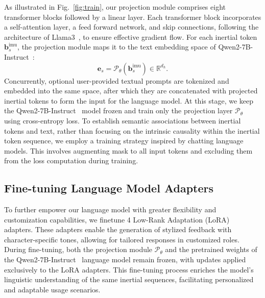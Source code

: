 As illustrated in Fig.~\ref{fig:train}, our projection module comprises eight transformer blocks followed by a linear layer. Each transformer block incorporates a self-attention layer, a feed forward network, and skip connections, following the architecture of Llama3~\cite{dubey2024llama}, to ensure effective gradient flow. For each inertial token $\mathbf{b}_s^{\textrm{imu}}$, the projection module maps it to the text embedding space of Qwen2-7B-Instruct~\cite{yang2024qwen2}:
\[
\mathbf{e}_s = \mathcal{P}_{\theta}(\mathbf{b}_s^{\textrm{imu}}) \in \mathbb{R}^{d_h}\text{.}
\]
Concurrently, optional user-provided textual prompts are tokenized and embedded into the same space, after which they are concatenated with projected inertial tokens to form the input for the language model. At this stage, we keep the Qwen2-7B-Instruct~\cite{yang2024qwen2} model frozen and train only the projection layer $\mathcal{P}_{\theta}$ using cross-entropy loss. To establish semantic associations between inertial tokens and text, rather than focusing on the intrinsic causality within the inertial token sequence, we employ a training strategy inspired by chatting language models. This involves augmenting mask to all input tokens and excluding them from the loss computation during training.

\subsection{Fine-tuning Language Model Adapters}
\label{sec:finetuning_lora}


To further empower our language model with greater flexibility and customization capabilities, we finetune 4 Low-Rank Adaptation (LoRA)~\cite{hu2022lora} adapters. These adapters enable the generation of stylized feedback with character-specific tones, allowing for tailored responses in customized roles. During fine-tuning, both the projection module $\mathcal{P}_{\theta}$ and the pretrained weights of the Qwen2-7B-Instruct~\cite{yang2024qwen2} language model remain frozen, with updates applied exclusively to the LoRA adapters. This fine-tuning process enriches the model's linguistic understanding of the same inertial sequences, facilitating personalized and adaptable usage scenarios.